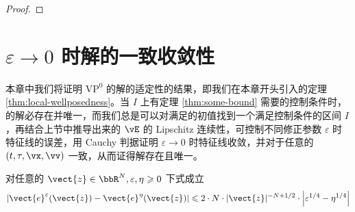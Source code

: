 \begin{proof}
\end{proof}


\section{\texorpdfstring{$\varepsilon \rightarrow 0$}{Lg} 时解的一致收敛性}

本章中我们将证明 $\text{VP}^{0}$ 的解的适定性的结果，即我们在本章开头引入的定理 \ref{thm:local-wellposedness}。当 $I$ 上有定理 \ref{thm:some-bound} 需要的控制条件时，\eqvp 的解必存在并唯一，而我们总是可以对满足\supremumf 的初值找到一个满足控制条件的区间 $I$，再结合上节中\lipOffVsphere 推导出来的 $\vE$ 的 Lipschitz 连续性，可控制不同修正参数 $\varepsilon$ 时特征线的误差，用 Cauchy 判据证明 $\varepsilon\rightarrow 0$ 时特征线收敛，并对于任意的 $(t,\tau,\vx,\vv)$ 一致，从而证得解存在且唯一。


\begin{lemma}
    对任意的 $\vect{z} \in \bbR^{N}, \varepsilon, \eta \geqslant 0$ 下式成立
\[
\left|\vect{e}^{\varepsilon}(\vect{z})-\vect{e}^{\eta}(\vect{z})\right| \leqslant 2 \cdot N \cdot|\vect{z}|^{-N+1 / 2} \cdot\left|\varepsilon^{1 / 4}-\eta^{1 / 4}\right|
\]
\end{lemma}

